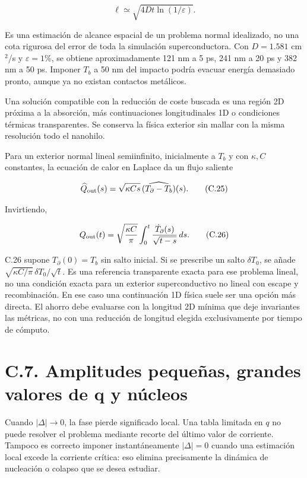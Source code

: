 \documentclass[
  spanish,
  10pt,
  a4paper,
]{article}
\begin{document}
\[
\ell\simeq\sqrt{4Dt\ln(1/\varepsilon)}. \tag{C.24}
\]

Es una estimación de alcance espacial de un problema normal idealizado,
no una cota rigurosa del error de toda la simulación superconductora.
Con \(D=1.581\) cm\(^2\)/s y \(\varepsilon=1\%\), se obtiene
aproximadamente 121 nm a 5 ps, 241 nm a 20 ps y 382 nm a 50 ps. Imponer
\(T_b\) a 50 nm del impacto podría evacuar energía demasiado pronto,
aunque ya no existan contactos metálicos.

Una solución compatible con la reducción de coste buscada es una región
2D próxima a la absorción, más continuaciones longitudinales 1D o
condiciones térmicas transparentes. Se conserva la física exterior sin
mallar con la misma resolución todo el nanohilo.

Para un exterior normal lineal semiinfinito, inicialmente a \(T_b\) y
con \(\kappa,C\) constantes, la ecuación de calor en Laplace da un flujo
saliente

\[
\widehat Q_{\rm out}(s)=\sqrt{\kappa Cs}\,
\widehat{(T_{\partial}-T_b)}(s). \tag{C.25}
\]

Invirtiendo,

\[
Q_{\rm out}(t)=\sqrt{\frac{\kappa C}{\pi}}
\int_0^t\frac{\dot T_{\partial}(s)}{\sqrt{t-s}}\,ds. \tag{C.26}
\]

C.26 supone \(T_\partial(0)=T_b\) sin salto inicial. Si se prescribe un
salto \(\delta T_0\), se añade
\(\sqrt{\kappa C/\pi}\,\delta T_0/\sqrt t\). Es una referencia
transparente exacta para ese problema lineal, no una condición exacta
para un exterior superconductivo no lineal con escape y recombinación.
En ese caso una continuación 1D física suele ser una opción más directa.
El ahorro debe evaluarse con la longitud 2D mínima que deje invariantes
las métricas, no con una reducción de longitud elegida exclusivamente
por tiempo de cómputo.

\section{C.7. Amplitudes pequeñas, grandes valores de q y
núcleos}\label{c.7.-amplitudes-pequeuxf1as-grandes-valores-de-q-y-nuxfacleos}

Cuando \(|\Delta|\to0\), la fase pierde significado local. Una tabla
limitada en \(q\) no puede resolver el problema mediante recorte del
último valor de corriente. Tampoco es correcto imponer instantáneamente
\(|\Delta|=0\) cuando una estimación local excede la corriente crítica:
eso elimina precisamente la dinámica de nucleación o colapso que se
desea estudiar.
\end{document}
